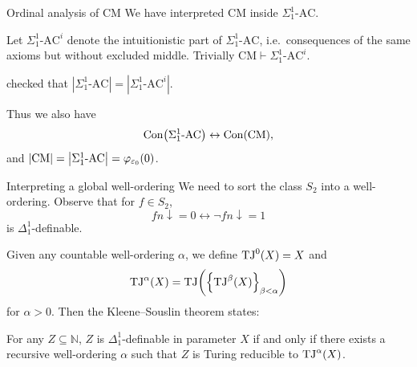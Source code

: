 \documentclass{beamer}
\begin{document}
\begin{frame}{Ordinal analysis of $\mathrm{CM}$}
  We have interpreted $\mathrm{CM}$ inside $\Sigma^1_1\text{-}\mathrm{AC}$.

  \vspace{1em}

  Let $\Sigma^1_1\text{-}\mathrm{AC}^i$ denote the intuitionistic part of $\Sigma^1_1\text{-}\mathrm{AC}$, i.e.\ consequences of the same axioms but without excluded middle. Trivially $\mathrm{CM} \vdash \Sigma^1_1\text{-}\mathrm{AC}^i$.

  \vspace{1em}

   checked that $\left|\Sigma^1_1\text{-}\mathrm{AC}\right| = \left|\Sigma^1_1\text{-}\mathrm{AC}^i\right|$.

  \vspace{1em}

  Thus we also have
  \[\mathrm{Con}\mleft(\Sigma^1_1\text{-}\mathrm{AC}\mright) \leftrightarrow \mathrm{Con}\mleft(\mathrm{CM}\mright),\]
  and $\left|\mathrm{CM}\right| = \left|\Sigma^1_1\text{-}\mathrm{AC}\right| = \varphi_{\varepsilon_0}\mleft(0\mright)$.
\end{frame}

\begin{frame}{Interpreting a global well-ordering}
  We need to sort the class $S_2$ into a well-ordering. Observe that for $f \in S_2$,
  \[fn {\downarrow} = 0 \leftrightarrow \neg fn {\downarrow} = 1\]
  is $\Delta^1_1$-definable.

  \vspace{1em}

  Given any countable well-ordering $\alpha$, we define $\mathrm{TJ}^0\mleft(X\mright) = X$ and
  \[\mathrm{TJ}^\alpha\mleft(X\mright) = \mathrm{TJ}\mleft(\left\{\mathrm{TJ}^\beta\mleft(X\mright)\right\}_{\beta < \alpha}\mright)\]
  for $\alpha > 0$. Then the Kleene--Souslin theorem states:

  \begin{theorem}
    For any $Z \subseteq \mathbb{N}$, $Z$ is $\Delta^1_1$-definable in parameter $X$ if and only if there exists a recursive well-ordering $\alpha$ such that $Z$ is Turing reducible to $\mathrm{TJ}^\alpha\mleft(X\mright)$.
  \end{theorem}
\end{frame}
\end{document}
